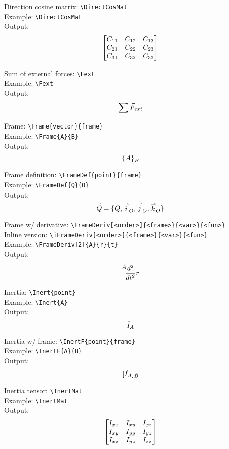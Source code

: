 \documentclass{article}
\begin{document}
\noindent
Direction cosine matrix: \verb|\DirectCosMat|\\
Example: \verb|\DirectCosMat|\\
Output:
\begin{equation*}
     \begin{bmatrix} C_{11} & C_{12} & C_{13} \\ C_{21} & C_{22} & C_{23} \\ C_{31} & C_{32} & C_{33} \end{bmatrix} 
\end{equation*}

\noindent
Sum of external forces: \verb|\Fext|\\
Example: \verb|\Fext|\\
Output:
\begin{equation*}
    \sum{\vec{F}_{ext}}
\end{equation*}    

\noindent
Frame: \verb|\Frame{vector}{frame}|\\
Example: \verb|\Frame{A}{B}|\\
Output:
\begin{equation*}
    {\{A\}}_{\bar{B}}
\end{equation*}    

\noindent
Frame definition: \verb|\FrameDef{point}{frame}|\\
Example: \verb|\FrameDef{Q}{O}|\\
Output:
\begin{equation*}
    \FrameDef{Q}{O}
\end{equation*}  

\noindent
Frame w/ derivative: \verb|\FrameDeriv[<order>]{<frame>}{<var>}{<fun>}|\\
Inline version: \verb|\iFrameDeriv[<order>]{<frame>}{<var>}{<fun>}|\\
Example: \verb|\FrameDeriv[2]{A}{r}{t}|\\
Output:
\begin{equation*}
    \FrameDeriv[2]{A}{t}{r}
\end{equation*}  

\noindent
Inertia: \verb|\Inert{point}|\\
Example: \verb|\Inert{A}|\\
Output:
\begin{equation*}
    \tilde{I}_{A}
\end{equation*}  

\noindent
Inertia w/ frame: \verb|\InertF{point}{frame}|\\
Example: \verb|\InertF{A}{B}|\\
Output:
\begin{equation*}
    \lbrack\tilde{I}_{A}\rbrack_{\bar{B}}
\end{equation*}  

\noindent
Inertia tensor: \verb|\InertMat|\\
Example: \verb|\InertMat|\\
Output:
\begin{equation*}
     \begin{bmatrix} I_{xx} & I_{xy} & I_{xz} \\ I_{xy} & I_{yy} & I_{yz} \\ I_{xz} & I_{yz} & I_{zz} \end{bmatrix}
\end{equation*}  
\end{document}
